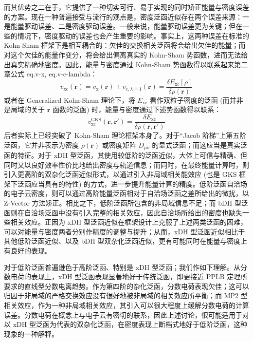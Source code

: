 而其优势之二在于，它提供了一种切实可行、易于实现的同时矫正能量与密度误差的方案。现在一种普遍接受与流行的观点是，密度泛函近似存在两个误差来源：一是能量驱动误差、二是密度驱动误差。一般来说，能量驱动误差更为关键\cite{Cohen-Yang.CR.2012}；但在一些的情况下，密度驱动的误差也会产生重要的影响\cite{Kim-Burke.JCP.2014}。事实上，这两种误差在标准的 Kohn-Sham 框架下是相互耦合的：欠佳的交换相关泛函将会给出欠佳的能量；而对这个欠佳的能量作变分，将会给出偏离真实的 Kohn-Sham 势函数，进而无法给出真实精确地密度。因此，能量与密度通过 Kohn-Sham 势函数得以联系起来\alert{第二章公式 eq.v-x, eq.v-c-lambda}：
\begin{equation}
    v_\mathrm{xc} (\bm{r}) = v_\mathrm{x} (\bm{r}) + v_{\mathrm{c}, \lambda=1} (\bm{r}) = \frac{\delta E_\mathrm{xc} [\rho]}{\delta \rho(\bm{r})}
\end{equation}
或者在 Generalized Kohn-Sham 理论下，将 $E_\mathrm{xc}$ 看作双粒子密度的泛函 (而并非是局域的关于 $\bm{r}$ 函数的泛函) 时，能量与密度通过下述势函数得以联系：
\begin{equation}
    v_\mathrm{xc}^\mathrm{GKS} (\bm{r}, \bm{r}') = \frac{\delta E_\mathrm{xc}}{\delta \rho(\bm{r}, \bm{r}')}
\end{equation}
后者实际上已经突破了 Kohn-Sham 理论框架本身了\cite{Su-Xu.WCMS.2016, Su-Xu.IJQC.2015, Su-Xu.MP.2016}。对于“Jacob 阶梯”上第五阶泛函，它并非表示为密度 $\rho(\bm{r})$ 或密度矩阵 $D_{\mu \nu}$ 的显式泛函；而这应当是真实泛函的特征\cite{Kohn-Kohn.PRB.1986, Yang-Mori-Sanchez.JCP.2012}。对于 xDH 型泛函，其使用较低阶的泛函近似，大体上可信与精确、但同时又以良好效率性价比地给出密度与轨道信息；而同时，在最终能量计算时，则引入更高阶的双杂化泛函近似形式，以通过引入非局域相关能效应 (也是 GKS 框架下泛函应当具有的特性) 的方式，进一步提升能量计算的精度。低阶泛函自洽场的电子云密度，则可以通过高阶能量泛函相对于自洽场泛函之差所给出的微扰，以 Z-Vector 方法矫正\cite{Handy-Schaefer.JCP.1984, Su-Xu.JCC.2013}。相比之下，低阶泛函所包含的非局域信息不足；而 bDH 型泛函则在自洽场泛函中没有引入完整的相关效应，因此自洽场所给出的密度也缺失一些相关效应。正因为 xDH 型泛函近似在框架设计上克服了上述两类泛函的困难，可以对能量与密度两者分别作精度的调整与提升；从而，xDH 型泛函近似相比于其他低阶泛函近似、以及 bDH 型双杂化泛函近似，更有可能同时在能量与密度上有良好的表现。

对于低阶泛函普遍逊色于高阶泛函、特别是 xDH 型泛函；我们作如下理解。从分数电荷的表现上，xDH 型泛函表现显著地好于传统泛函\cite{Su-Xu.IJQC.2015, Su-Xu.WCMS.2016, Su-Xu.MP.2016, Su-Xu.ARPC.2017}，即更接近 PPLB 定理所要求的直线型分数电离趋势\cite{Perdew-Balduz.PRL.1982}。作为第四阶的杂化泛函，分数电荷表现欠佳；这可以归因于非局域的严格交换效应没有很好地被非局域的相关效应所平衡；而 MP2 型相关效应，作为一种非局域相关效应，其引入可以很大程度上缓解分数电荷的计算误差。分数电荷在概念上与电子云有密切的联系，因此上述讨论，很可能适用于对以 xDH 型泛函为代表的双杂化泛函，在密度表现上断档式地好于低阶泛函，这种现象的一种解释。

